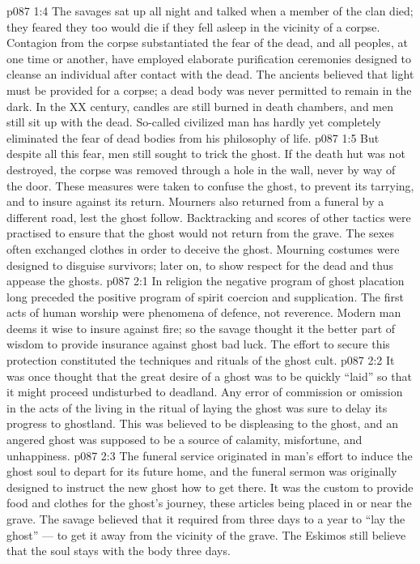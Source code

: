 \vs p087 1:4 The savages sat up all night and talked when a member of the clan died; they feared they too would die if they fell asleep in the vicinity of a corpse. Contagion from the corpse substantiated the fear of the dead, and all peoples, at one time or another, have employed elaborate purification ceremonies designed to cleanse an individual after contact with the dead. The ancients believed that light must be provided for a corpse; a dead body was never permitted to remain in the dark. In the XX century, candles are still burned in death chambers, and men still sit up with the dead. So\hyp{}called civilized man has hardly yet completely eliminated the fear of dead bodies from his philosophy of life.
\vs p087 1:5 But despite all this fear, men still sought to trick the ghost. If the death hut was not destroyed, the corpse was removed through a hole in the wall, never by way of the door. These measures were taken to confuse the ghost, to prevent its tarrying, and to insure against its return. Mourners also returned from a funeral by a different road, lest the ghost follow. Backtracking and scores of other tactics were practised to ensure that the ghost would not return from the grave. The sexes often exchanged clothes in order to deceive the ghost. Mourning costumes were designed to disguise survivors; later on, to show respect for the dead and thus appease the ghosts.
\vs p087 2:1 In religion the negative program of ghost placation long preceded the positive program of spirit coercion and supplication. The first acts of human worship were phenomena of defence, not reverence. Modern man deems it wise to insure against fire; so the savage thought it the better part of wisdom to provide insurance against ghost bad luck. The effort to secure this protection constituted the techniques and rituals of the ghost cult.
\vs p087 2:2 \pc It was once thought that the great desire of a ghost was to be quickly “laid” so that it might proceed undisturbed to deadland. Any error of commission or omission in the acts of the living in the ritual of laying the ghost was sure to delay its progress to ghostland. This was believed to be displeasing to the ghost, and an angered ghost was supposed to be a source of calamity, misfortune, and unhappiness.
\vs p087 2:3 The funeral service originated in man’s effort to induce the ghost soul to depart for its future home, and the funeral sermon was originally designed to instruct the new ghost how to get there. It was the custom to provide food and clothes for the ghost’s journey, these articles being placed in or near the grave. The savage believed that it required from three days to a year to “lay the ghost” --- to get it away from the vicinity of the grave. The Eskimos still believe that the soul stays with the body three days.
